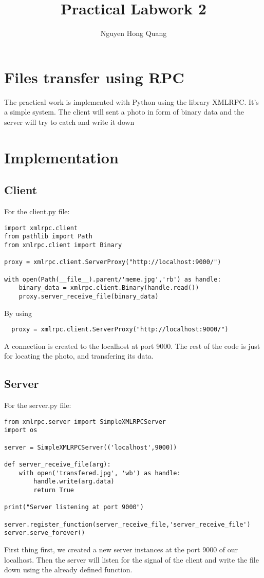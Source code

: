 \documentclass{article}
\title{Practical Labwork 2}
\author{Nguyen Hong Quang}
\begin{document}
\maketitle

\section{Files transfer using RPC}
The practical work is implemented with Python using the library XMLRPC. It's a simple system.
The client will sent a photo in form of binary data and the server will try to catch and write it down 

\section{Implementation}
\subsection{Client}
For the client.py file:
\begin{verbatim}
import xmlrpc.client
from pathlib import Path
from xmlrpc.client import Binary 

proxy = xmlrpc.client.ServerProxy("http://localhost:9000/")

with open(Path(__file__).parent/'meme.jpg','rb') as handle:
    binary_data = xmlrpc.client.Binary(handle.read())
    proxy.server_receive_file(binary_data)
\end{verbatim}

By using 
\begin{verbatim}
  proxy = xmlrpc.client.ServerProxy("http://localhost:9000/")
\end{verbatim}
A connection is created to the localhost at port 9000. The rest of the code is just for locating the photo, and transfering its data.
\subsection{Server}
For the server.py file: 
\begin{verbatim}
from xmlrpc.server import SimpleXMLRPCServer
import os 

server = SimpleXMLRPCServer(('localhost',9000))

def server_receive_file(arg):
    with open('transfered.jpg', 'wb') as handle: 
        handle.write(arg.data)
        return True

print("Server listening at port 9000")

server.register_function(server_receive_file,'server_receive_file')
server.serve_forever()
\end{verbatim}
First thing first, we created a new server instances at the port 9000 of our localhost. Then the server will listen for the signal of the client and write the file down using the already defined function. 
\end{document}
